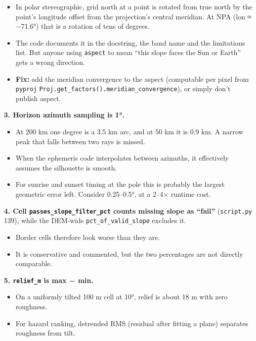 \documentclass[11pt,a4paper]{article}
\providecommand{\tightlist}{\setlength{\itemsep}{0pt}\setlength{\parskip}{0pt}}
\begin{document}
\begin{itemize}
\tightlist
\item
  In polar stereographic, grid north at a point is rotated from true
  north by the point's longitude offset from the projection's central
  meridian. At NPA (lon ≈ −71.6°) that is a rotation of tens of degrees.
\item
  The code documents it in the docstring, the band name and the
  limitations list. But anyone using \texttt{aspect} to
  mean ``this slope faces the Sun or Earth'' gets a wrong direction.
\item
  \textbf{Fix:} add the meridian convergence to the aspect (computable
  per pixel from \texttt{pyproj}
  \texttt{Proj.get\_factors().meridian\_convergence}),
  or simply don't publish aspect.
\end{itemize}

\textbf{3. Horizon azimuth sampling is 1°.}

\begin{itemize}
\tightlist
\item
  At 200 km one degree is a 3.5 km arc, and at 50 km it is 0.9 km. A
  narrow peak that falls between two rays is missed.
\item
  When the ephemeris code interpolates between azimuths, it effectively
  assumes the silhouette is smooth.
\item
  For sunrise and sunset timing at the pole this is probably the largest
  geometric error left. Consider 0.25--0.5°, at a 2--4× runtime cost.
\end{itemize}

\textbf{4. Cell \texttt{passes\_slope\_filter\_pct}
counts missing slope as ``fail''} (\texttt{script.py}
139), while the DEM-wide \texttt{pct\_of\_valid\_slope}
excludes it.

\begin{itemize}
\tightlist
\item
  Border cells therefore look worse than they are.
\item
  It is conservative and commented, but the two percentages are not
  directly comparable.
\end{itemize}

\textbf{5. \texttt{relief\_m} is max − min.}

\begin{itemize}
\tightlist
\item
  On a uniformly tilted 100 m cell at 10°, relief is about 18 m with
  zero roughness.
\item
  For hazard ranking, detrended RMS (residual after fitting a plane)
  separates roughness from tilt.
\end{itemize}
\end{document}
